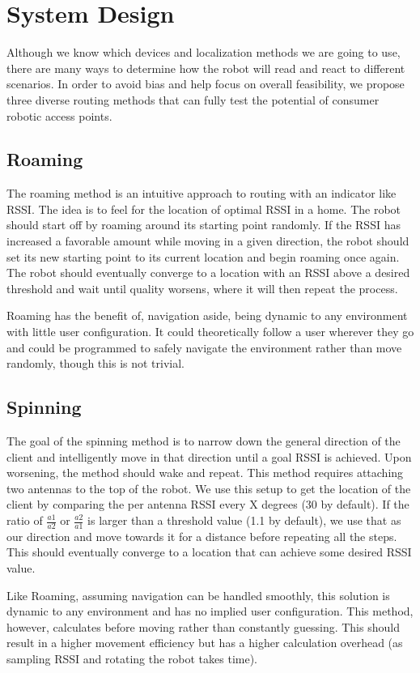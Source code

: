 \section{System Design}
Although we know which devices and localization methods we are going to use, there are many ways to determine how the robot will read and react to different scenarios. In order to avoid bias and help focus on overall feasibility, we propose three diverse routing methods that can fully test the potential of consumer robotic access points.

\subsection{Roaming}
The roaming method is an intuitive approach to routing with an indicator like RSSI. The idea is to feel for the location of optimal RSSI in a home. The robot should start off by roaming around its starting point randomly. If the RSSI has increased a favorable amount while moving in a given direction, the robot should set its new starting point to its current location and begin roaming once again. The robot should eventually converge to a location with an RSSI above a desired threshold and wait until quality worsens, where it will then repeat the process.\par
Roaming has the benefit of, navigation aside, being dynamic to any environment with little user configuration. It could theoretically follow a user wherever they go and could be programmed to safely navigate the environment rather than move randomly, though this is not trivial.


\subsection{Spinning}
The goal of the spinning method is to narrow down the general direction of the client and intelligently move in that direction until a goal RSSI is achieved. Upon worsening, the method should wake and repeat. This method requires attaching two antennas to the top of the robot. We use this setup to get the location of the client by comparing the per antenna RSSI every X degrees (30 by default). If the ratio of \(\frac{a1}{a2}\) or \(\frac{a2}{a1}\) is larger than a threshold value (1.1 by default), we use that as our direction and move towards it for a distance before repeating all the steps. This should eventually converge to a location that can achieve some desired RSSI value.\par
Like Roaming, assuming navigation can be handled smoothly, this solution is dynamic to any environment and has no implied user configuration. This method, however, calculates before moving rather than constantly guessing. This should result in a higher movement efficiency but has a higher calculation overhead (as sampling RSSI and rotating the robot takes time).

